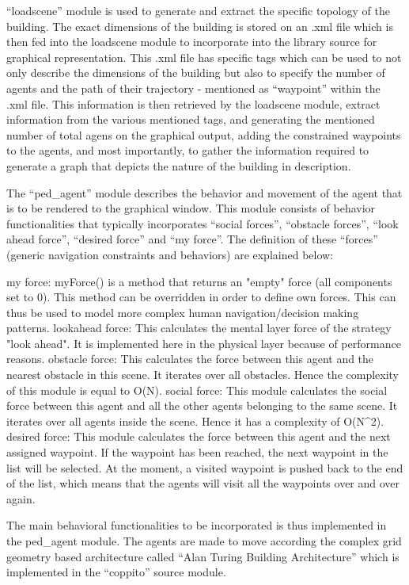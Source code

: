 “loadscene” module is used to generate and extract the specific topology of the building. The exact dimensions of the building is stored on an .xml file which is then fed into the loadscene module to incorporate into the library source for graphical representation. This .xml file has specific tags which can be used to not only describe the dimensions of the building but also to specify the number of agents and the path of their trajectory - mentioned as “waypoint” within the .xml file. This information is then retrieved by the loadscene module, extract information from the various mentioned tags, and generating the mentioned number of total agens on the graphical output, adding the constrained waypoints to the agents, and most importantly, to gather the information required to generate a graph that depicts the nature of the building in description.

The “ped_agent” module describes the behavior and movement of the agent that is to be rendered to the graphical window. This module consists of behavior functionalities that typically incorporates “social forces”, “obstacle forces”, “look ahead force”, “desired force” and “my force”. The definition of these “forces” (generic navigation constraints and behaviors) are explained below:

my force:
myForce() is a method that returns an "empty" force (all components set to 0). This method can be overridden in order to define own forces. This can thus be used to model more complex human navigation/decision making patterns.
lookahead force:
This calculates the mental layer force of the strategy "look ahead". It is implemented here in the physical layer because of performance reasons.
obstacle force:
This calculates the force between this agent and the nearest obstacle in this scene.
It iterates over all obstacles.
Hence the complexity of this module is equal to O(N).
social force:
This module calculates the social force between this agent and all the other agents belonging to the same scene.  It iterates over all agents inside the scene.
Hence it has a complexity of O(N^2).
desired force:
This module calculates the force between this agent and the next assigned waypoint.  If the waypoint has been reached, the next waypoint in the list will be selected.
At the moment, a visited waypoint is pushed back to the end of the list, which means that the agents will visit all the waypoints over and over again.
  
The main behavioral functionalities to be incorporated is thus implemented in the ped_agent module. The agents are made to move according the complex grid geometry based architecture called “Alan Turing Building Architecture” which is implemented in the “coppito” source module.

